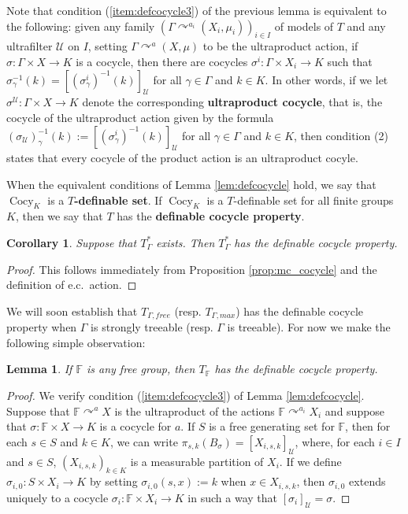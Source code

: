 \documentclass[12pt]{amsart}
\newtheorem{lem}[thm]{Lemma}
\newtheorem{cor}[thm]{Corollary}
\theoremstyle{definition}
\def\bb{\mathbb}
\def\bb{\mathbb}
\def\u{\mathsf 1}
\def \u{\mathcal U}
\def\Cocy{\operatorname{Cocy}}
\newcommand{\acts}{\curvearrowright}
\begin{document}
Note that condition (\ref{item:defcocycle3}) of the previous lemma is equivalent to the following:  given any family $(\Gamma\acts^{a_i} (X_i,\mu_i))_{i\in I}$ of models of $T$ and any ultrafilter $\u$ on $I$, setting $\Gamma\acts^a (X,\mu)$ to be the ultraproduct action, if $\sigma:\Gamma\times X\to K$ is a cocycle, then there are cocycles $\sigma^i:\Gamma\times X_i\to K$ such that $\sigma_\gamma^{-1}(k)=[(\sigma_\gamma^i)^{-1}(k)]_\u$ for all $\gamma\in \Gamma$ and $k\in K$.  In other words, if we let $\sigma^\u:\Gamma\times X\to K$ denote the corresponding \textbf{ultraproduct cocycle}, that is, the cocycle of the ultraproduct action given by the formula $(\sigma_\u)_\gamma^{-1}(k):=[(\sigma_\gamma^i)^{-1}(k)]_\u$ for all $\gamma\in \Gamma$ and $k\in K$, then condition (2) states that every cocycle of the product action is an ultraproduct cocyle.

When the equivalent conditions of Lemma \ref{lem:defcocycle} hold, we say that $\Cocy_K$ is a \textbf{$T$-definable set}. If $\Cocy_K$ is a $T$-definable set for all finite groups $K$, then we say that $T$ has the \textbf{definable cocycle property}.

\begin{cor}
Suppose that $T_\Gamma^*$ exists.  Then $T_\Gamma^*$ has the definable cocycle property.
\end{cor}

\begin{proof}
This follows immediately from Proposition \ref{prop:mc_cocycle} and the definition of e.c.\ action.
\end{proof}

We will soon establish that $T_{\Gamma, free}$ (resp. $T_{\Gamma, max}$) has the definable cocycle property when $\Gamma$ is strongly treeable (resp. $\Gamma$ is treeable). For now we make the following simple observation:

\begin{lem}\label{freedefcocycle}
If $\bb F$ is any free group, then $T_{\bb F}$ has the definable cocycle property.
\end{lem}

\begin{proof}
We verify condition (\ref{item:defcocycle3}) of Lemma \ref{lem:defcocycle}. Suppose that $\bb F \acts^a X$ is the ultraproduct of the actions $\bb F\acts^{a_i}X_i$ and suppose that $\sigma:\bb F\times X\to K$ is a cocycle for $a$.  If $S$ is a free generating set for $\bb F$, then for each $s \in S$ and $k\in K$, we can write $\pi_{s,k}(B_\sigma)=[X_{i,s,k}]_\u$, where, for each $i\in I$ and $s \in S$, $(X_{i,s,k})_{k \in K}$ is a measurable partition of $X_i$.  If we define $\sigma_{i,0}:S\times X_i\to K$ by setting $\sigma_{i,0}(s,x):=k$ when $x\in X_{i,s,k}$, then $\sigma_{i,0}$ extends uniquely to a cocycle $\sigma_i:\bb F\times X_i\to K$ in such a way that $[\sigma_i]_\u=\sigma$. 
\end{proof}
\end{document}

